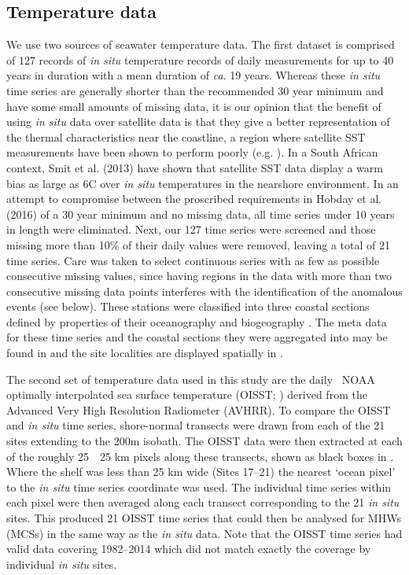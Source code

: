 \documentclass[a4paper,10pt,review]{elsarticle}
\begin{document}
\subsection{Temperature data}
We use two sources of seawater temperature data. The first dataset is comprised of 127 records of \emph{in situ} temperature records of daily measurements for up to 40 years in duration with a mean duration of \emph{ca}. 19 years. Whereas these \emph{in situ} time series are generally shorter than the recommended 30 year minimum \cite{Hobday2016} and have some small amounts of missing data, it is our opinion that the benefit of using \emph{in situ} data over satellite data is that they give a better representation of the thermal characteristics near the coastline, a region where satellite SST measurements have been shown to perform poorly (e.g. \cite{Smale2009, Castillo2010}). In a South African context, Smit et al. (2013) \cite{Smit2013} have shown that satellite SST data display a warm bias as large as 6\degree C over \emph{in situ} temperatures in the nearshore environment. In an attempt to compromise between the proscribed requirements in Hobday et al. (2016) \cite{Hobday2016} of a 30 year minimum and no missing data, all time series under 10 years in length were eliminated. Next, our 127 time series were screened and those missing more than 10\% of their daily values were removed, leaving a total of 21 time series. Care was taken to select continuous series with as few as possible consecutive missing values, since having regions in the data with more than two consecutive missing data points interferes with the identification of the anomalous events (see below). These stations were classified into three coastal sections defined by properties of their oceanography and biogeography \cite{Smit2013}. The meta data for these time series and the coastal sections they were aggregated into may be found in  and the site localities are displayed spatially in .

The second set of temperature data used in this study are the daily \degree~NOAA optimally interpolated sea surface temperature (OISST; \cite{Reynolds2007}) derived from the Advanced Very High Resolution Radiometer (AVHRR). To compare the OISST and \emph{in situ} time series, shore-normal transects were drawn from each of the 21 sites extending to the 200m isobath. The OISST data were then extracted at each of the roughly 25~\texttimes~25 km pixels along these transects, shown as black boxes in . Where the shelf was less than 25 km wide (Sites 17--21) the nearest `ocean pixel' to the \emph{in situ} time series coordinate was used. The individual time series within each pixel were then averaged along each transect corresponding to the 21 \emph{in situ} sites. This produced 21 OISST time series that could then be analysed for MHWs (MCSs) in the same way as the \emph{in situ} data. Note that the OISST time series had valid data covering 1982--2014 which did not match exactly the coverage by individual \emph{in situ} sites.
\end{document}
